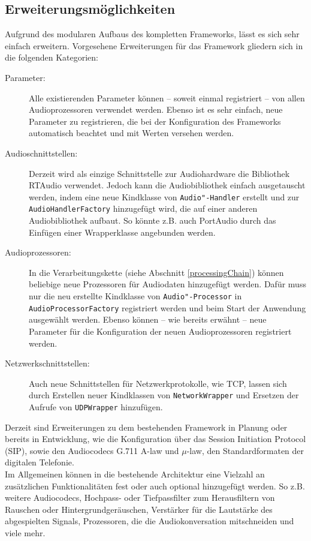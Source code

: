\subsection{Erweiterungsmöglichkeiten}
Aufgrund des modularen Aufbaus des kompletten Frameworks, lässt es sich sehr einfach erweitern. Vorgesehene Erweiterungen für das Framework gliedern sich in die folgenden Kategorien:
\begin{description}
\item[Parameter:] Alle existierenden Parameter können -- soweit einmal registriert -- von allen Audioprozessoren verwendet werden. Ebenso ist es sehr einfach, neue Parameter zu registrieren, die bei der Konfiguration des Frameworks automatisch beachtet und mit Werten versehen werden.
\item[Audioschnittstellen:] Derzeit wird als einzige Schnittstelle zur Audiohardware die Bibliothek RTAudio verwendet. Jedoch kann die Audiobibliothek einfach ausgetauscht werden, indem eine neue Kindklasse von \texttt{Audio"-Handler} erstellt und zur \texttt{AudioHandlerFactory} hinzugefügt wird, die auf einer anderen Audiobibliothek aufbaut. So könnte z.B. auch PortAudio durch das Einfügen einer Wrapperklasse angebunden werden.
\item[Audioprozessoren:] In die Verarbeitungskette (siehe Abschnitt \ref{processingChain}) können beliebige neue Prozessoren für Audiodaten hinzugefügt werden. Dafür muss nur die neu erstellte Kindklasse von \texttt{Audio"-Processor} in \texttt{AudioProcessorFactory} registriert werden und beim Start der Anwendung ausgewählt werden. Ebenso können -- wie bereits erwähnt -- neue Parameter für die Konfiguration der neuen Audioprozessoren registriert werden.
\item[Netzwerkschnittstellen:] Auch neue Schnittstellen für Netzwerkprotokolle, wie TCP, lassen sich durch Erstellen neuer Kindklassen von \texttt{NetworkWrapper} und Ersetzen der Aufrufe von \texttt{UDPWrapper} hinzufügen.
\end{description}
Derzeit sind Erweiterungen zu dem bestehenden Framework in Planung oder bereits in Entwicklung, wie die Konfiguration über das Session Initiation Protocol (SIP), sowie den Audiocodecs G.711 A-law und $\mu$-law, den Standardformaten der digitalen Telefonie.
\\
Im Allgemeinen können in die bestehende Architektur eine Vielzahl an zusätzlichen Funktionalitäten fest oder auch optional hinzugefügt werden. So z.B. weitere Audiocodecs, Hochpass- oder Tiefpassfilter zum Herausfiltern von Rauschen oder Hintergrundgeräuschen, Verstärker für die Lautstärke des abgespielten Signals, Prozessoren, die die Audiokonversation mitschneiden und viele mehr.

